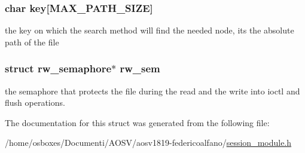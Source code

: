 \subsubsection[{\texorpdfstring{key}{key}}]{\setlength{\rightskip}{0pt plus 5cm}char key\mbox{[}{\bf M\+A\+X\+\_\+\+P\+A\+T\+H\+\_\+\+S\+I\+ZE}\mbox{]}}\hypertarget{structsession__file__node_ae4c213ccac480eb9759b4c5fc70ac77f}{}\label{structsession__file__node_ae4c213ccac480eb9759b4c5fc70ac77f}
the key on which the search method will find the needed node, it\textquotesingle{}s the absolute path of the file 
\subsubsection[{\texorpdfstring{rw\+\_\+sem}{rw_sem}}]{\setlength{\rightskip}{0pt plus 5cm}struct rw\+\_\+semaphore$\ast$ rw\+\_\+sem}\hypertarget{structsession__file__node_a0eba6b6e0bbe3d55110a724c3c08d1c2}{}\label{structsession__file__node_a0eba6b6e0bbe3d55110a724c3c08d1c2}
the semaphore that protects the file during the read and the write into ioctl and flush operations. 

The documentation for this struct was generated from the following file\+:\begin{DoxyCompactItemize}
\item 
/home/osboxes/\+Documenti/\+A\+O\+S\+V/aosv1819-\/federicoalfano/\hyperlink{session__module_8h}{session\+\_\+module.\+h}\end{DoxyCompactItemize}
